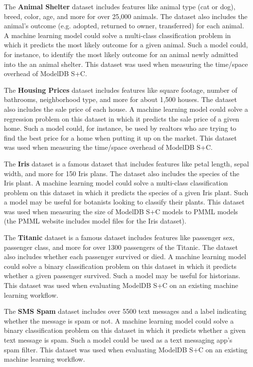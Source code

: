 The \textbf{Animal Shelter} dataset \cite{animal} includes features like
animal type (cat or dog), breed, color, age, and more for over 25,000 animals. The
dataset also includes the animal's outcome (e.g. adopted, returned to owner, transferred)
for each animal. A machine learning model could solve a multi-class classification
problem in which it predicts the most likely outcome for a given animal. Such a model could, for
instance, to identify the most likely outcome for an animal newly admitted into the
an animal shelter. This dataset was used when measuring the time/space overhead
of ModelDB S+C.

The \textbf{Housing Prices} dataset \cite{housing} includes features like square
footage, number of bathrooms, neighborhood type, and more for about 1,500 houses.
The dataset also includes the sale price of each house. A machine learning model
could solve a regression problem on this dataset in which it predicts the sale
price of a given home. Such a model could, for instance, be used by realtors who
are trying to find the best price for a home when putting it up on the market. This
dataset was used when measuring the time/space overhead of ModelDB S+C.

The \textbf{Iris} dataset \cite{iris} is a famous dataset that includes features
like petal length, sepal width, and more for 150 Iris plans. The dataset also
includes the species of the Iris plant. A machine learning model could solve a 
multi-class classification problem on this dataset in which it predicts the species
of a given Iris plant. Such a model may be useful for botanists looking to classify
their plants. This dataset was used when measuring the size of ModelDB S+C models
to PMML models (the PMML website includes model files for the Iris dataset).

The \textbf{Titanic} dataset \cite{titanic} is a famous dataset includes features like 
passenger sex, passenger class, and more for over 1300 passengers of the Titanic. 
The dataset also includes whether each passenger survived or died. A machine learning
model could solve a binary classification problem on this dataset in which it predicts whether
a given passenger survived. Such a model may be useful for historians. This dataset
was used when evaluating ModelDB S+C on an existing machine learning workflow.

The \textbf{SMS Spam} dataset \cite{spam} includes over 5500 text messages and
a label indicating whether the message is spam or not. A machine learning model
could solve a binary classification problem on this dataset in which it predicts
whether a given text message is spam. Such a model could be used as a text messaging
app's spam filter. This dataset was used when evaluating ModelDB S+C on an existing
machine learning workflow.

